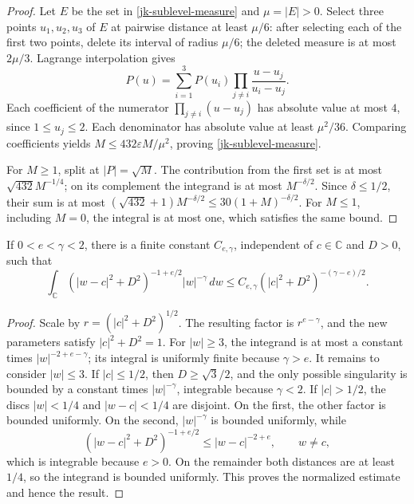 \begin{proof}
Let \(E\) be the set in \eqref{jk-sublevel-measure} and
\(\mu=|E|>0\).  Select three points \(u_1,u_2,u_3\) of \(E\)
at pairwise distance at least \(\mu/6\): after selecting each
of the first two points, delete its interval of radius
\(\mu/6\); the deleted measure is at most \(2\mu/3\).
Lagrange interpolation gives
\[
 P(u)=\sum_{i=1}^{3}P(u_i)
              \prod_{j\ne i}\frac{u-u_j}{u_i-u_j}.
\]
Each coefficient of the numerator \(\prod_{j\ne i}(u-u_j)\)
has absolute value at most \(4\), since \(1\leq u_j\leq2\).
Each denominator has absolute value at least \(\mu^2/36\).
Comparing coefficients yields
\(M\leq432\varepsilon M/\mu^2\), proving
\eqref{jk-sublevel-measure}.

For \(M\geq1\), split at \(|P|=\sqrt M\).
The contribution from the first set is at most
\(\sqrt{432}M^{-1/4}\); on its complement the integrand
is at most \(M^{-\delta/2}\).
Since \(\delta\leq1/2\), their sum is at most
\((\sqrt{432}+1)M^{-\delta/2}
 \leq30(1+M)^{-\delta/2}\).
For \(M\leq1\), including \(M=0\), the integral is at most one,
which satisfies the same bound.
\end{proof}

\begin{lemma}\label{jk-riesz}
If \(0<e<\gamma<2\), there is a finite constant
\(C_{e,\gamma}\), independent of \(c\in\mathbb C\) and \(D>0\),
such that
\begin{equation}\label{jk-riesz-bound}
 \int_{\mathbb C}
 (|w-c|^2+D^2)^{-1+e/2}|w|^{-\gamma}\,dw
       \leq C_{e,\gamma}(|c|^2+D^2)^{-(\gamma-e)/2}.
\end{equation}
\end{lemma}

\begin{proof}
Scale by \(r=(|c|^2+D^2)^{1/2}\).  The resulting factor is
\(r^{e-\gamma}\), and the new parameters satisfy
\(|c|^2+D^2=1\).
For \(|w|\geq3\), the integrand is at most a constant times
\(|w|^{-2+e-\gamma}\); its integral is uniformly finite because
\(\gamma>e\).
It remains to consider \(|w|\leq3\).
If \(|c|\leq1/2\), then \(D\geq\sqrt3/2\), and the only
possible singularity is bounded by a constant times
\(|w|^{-\gamma}\), integrable because \(\gamma<2\).
If \(|c|>1/2\), the discs \(|w|<1/4\) and
\(|w-c|<1/4\) are disjoint.
On the first, the other factor is bounded uniformly.
On the second, \(|w|^{-\gamma}\) is bounded uniformly, while
\[
 (|w-c|^2+D^2)^{-1+e/2}\leq |w-c|^{-2+e},
 \qquad w\ne c,
\]
which is integrable because \(e>0\).
On the remainder both distances are at least \(1/4\), so
the integrand is bounded uniformly.
This proves the normalized estimate and hence the result.
\end{proof}

